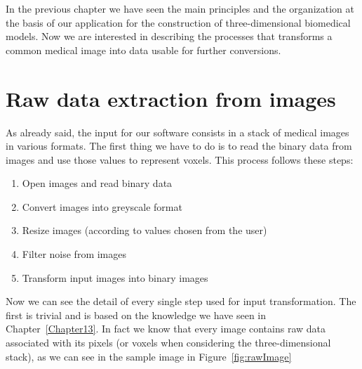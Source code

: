 In the previous chapter we have seen the main principles and the organization at the basis of our application for the construction of three-dimensional biomedical models. Now we are interested in describing the processes that transforms a common medical image into data usable for further conversions.

\section{Raw data extraction from images}\label{sec32:DataExtraction}

As already said, the input for our software consists in a stack of medical images in various formats. The first thing we have to do is to read the binary data from images and use those values to represent voxels. This process follows these steps:
\begin{enumerate}
 \item Open images and read binary data
 \item Convert images into greyscale format
 \item Resize images (according to values chosen from the user)
 \item Filter noise from images
 \item Transform input images into binary images
\end{enumerate}

Now we can see the detail of every single step used for input transformation. The first is trivial and is based on the knowledge we have seen in Chapter~\ref{Chapter13}. In fact we know that every image contains raw data associated with its pixels (or voxels when considering the three-dimensional stack), as we can see in the sample image in Figure~\ref{fig:rawImage}

